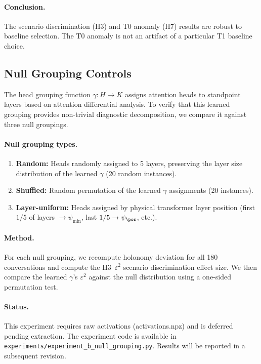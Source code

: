 \paragraph{Conclusion.}
The scenario discrimination (H3) and T0 anomaly (H7) results are robust to
baseline selection. The T0 anomaly is not an artifact of a particular T1 baseline
choice.

\subsection{Null Grouping Controls}
\label{app:null-grouping}

The head grouping function $\gamma : H \to K$ assigns attention heads to
standpoint layers based on attention differential analysis. To verify that this
learned grouping provides non-trivial diagnostic decomposition, we compare it
against three null groupings.

\paragraph{Null grouping types.}
\begin{enumerate}
    \item \textbf{Random:} Heads randomly assigned to 5 layers, preserving the
    layer size distribution of the learned $\gamma$ (20 random instances).
    \item \textbf{Shuffled:} Random permutation of the learned $\gamma$ assignments
    (20 instances).
    \item \textbf{Layer-uniform:} Heads assigned by physical transformer layer
    position (first $1/5$ of layers $\to \psi_{\min}$, last $1/5 \to \psi_{\pos}$,
    etc.).
\end{enumerate}

\paragraph{Method.}
For each null grouping, we recompute holonomy deviation for all 180 conversations
and compute the H3~$\varepsilon^2$ scenario discrimination effect size. We then
compare the learned $\gamma$'s $\varepsilon^2$ against the null distribution using
a one-sided permutation test.

\paragraph{Status.}
This experiment requires raw activations (activations.npz) and is deferred pending
extraction. The experiment code is available in
\texttt{experiments/experiment\_b\_null\_grouping.py}. Results will be reported in
a subsequent revision.

